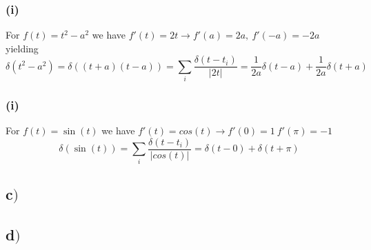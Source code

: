 \documentclass{article}
\begin{document}
\subsubsection*{(i)}
For $f(t) = t^2 -a^2$ we have $f'(t) = 2t \rightarrow f'(a) = 2a, \ f'(-a) = -2a$ yielding
\begin{equation}
\delta(t^2 - a^2) = \delta((t+a)(t-a)) = \sum_{i} \frac{\delta(t-t_i)}{|2t|} = \frac{1}{2a}\delta(t-a) + \frac{1}{2a}\delta(t+a)
\end{equation}

\subsubsection*{(i)}
For $f(t) = \sin(t)$ we have $f'(t) = cos(t) \rightarrow f'(0) = 1 \ f'(\pi) = -1$
\begin{equation}
\delta(\sin{(t)}) = \sum_{i} \frac{\delta(t-t_i)}{|cos(t)|} = \delta(t-0) +\delta(t+\pi)
\end{equation}


\subsection*{c$)$}


\subsection*{d$)$}
\end{document}
